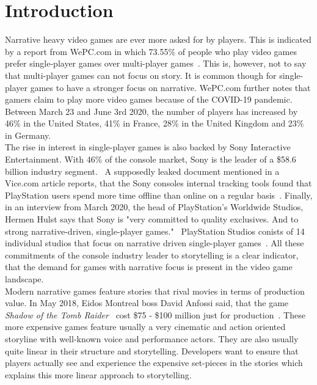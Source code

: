 \chapter{Introduction}
Narrative heavy video games are ever more asked for by players. This is indicated by a report from WePC.com in which 73.55\% of people who play video games prefer single-player games over multi-player games~\cite{WePC2021}. This is, however, not to say that multi-player games can not focus on story. It is common though for single-player games to have a stronger focus on narrative. WePC.com further notes that gamers claim to play more video games because of the COVID-19 pandemic. Between March 23 and June 3rd 2020, the number of players has increased by 46\% in the United States, 41\% in France, 28\% in the United Kingdom and 23\% in Germany.~\cite{WePC2021}\\
The rise in interest in single-player games is also backed by Sony Interactive Entertainment. With 46\% of the console market, Sony is the leader of a \$58.6 billion industry segment.~\cite{Dealessandri2021} A supposedly leaked document mentioned in a Vice.com article reports, that the Sony consoles internal tracking tools found that PlayStation users spend more time offline than online on a regular basis~\cite{Klepek2020}. Finally, in an interview from March 2020, the head of PlayStation's Worldwide Studios, Hermen Hulst says that Sony is "very committed to quality exclusives. And to strong narrative-driven, single-player games."~\cite{Shuman2021} PlayStation Studios conists of 14 individual studios that focus on narrative driven single-player games~\cite{Sony2021}. All these commitments of the console industry leader to storytelling is a clear indicator, that the demand for games with narrative focus is present in the video game landscape.\\
Modern narrative games feature stories that rival movies in terms of production value. In May 2018, Eidos Montreal boss David Anfossi said, that the game \textit{Shadow of the Tomb Raider}~\cite{tombraider} cost \$75 - \$100 million just for production~\cite{Dring2018}. These more expensive games feature usually a very cinematic and action oriented storyline with well-known voice and performance actors. They are also usually quite linear in their structure and storytelling. Developers want to ensure that players actually see and experience the expensive set-pieces in the stories  which explains this more linear approach to storytelling.\\
